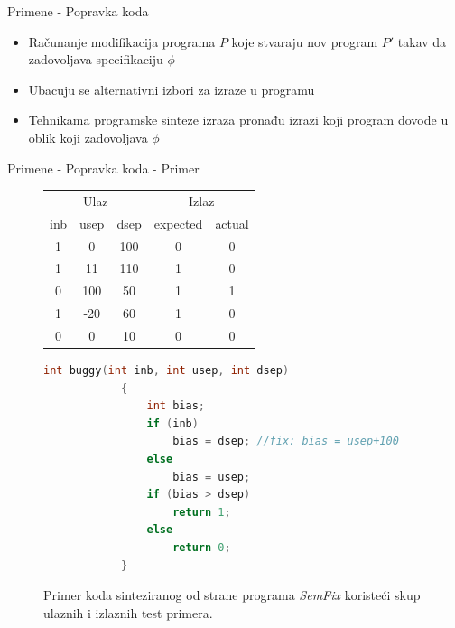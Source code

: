 \documentclass{beamer}
\begin{document}
\begin{frame}{Primene - Popravka koda}
    \begin{itemize}
        \item Računanje modifikacija programa $P$ koje stvaraju nov program $P'$ takav da zadovoljava specifikaciju $\phi$
        \item Ubacuju se alternativni izbori za izraze u programu
        \item Tehnikama programske sinteze izraza pronađu izrazi koji program dovode u oblik koji zadovoljava $\phi$
    \end{itemize}
\end{frame}

\begin{frame}[fragile]{Primene - Popravka koda - Primer}
    \begin{figure}[!h]
        \centering
        \tiny
        \begin{tabular}{ccc|cc}
            \multicolumn{3}{c|}{Ulaz} & \multicolumn{2}{c}{Izlaz}\\
            inb & usep & dsep & expected & actual \\
            \hline
            1 & 0 & 100 & 0 & 0 \\
            1 & 11 & 110 & 1 & 0 \\
            0 & 100 & 50 & 1 & 1 \\
            1 & -20 & 60 & 1 & 0 \\
            0 & 0 & 10 & 0 & 0 \\
        \end{tabular}

        \centering
        \begin{lstlisting}[language=C, basicstyle=\tiny]
            int buggy(int inb, int usep, int dsep)
            {
                int bias;
                if (inb)
                    bias = dsep; //fix: bias = usep+100
                else
                    bias = usep;
                if (bias > dsep)
                    return 1;
                else
                    return 0;
            }
        \end{lstlisting}

        \caption{Primer koda sinteziranog od strane programa \emph{SemFix} koristeći skup ulaznih i izlaznih test primera.}
        \label{fig:CodeRepair}
    \end{figure}
\end{frame}
\end{document}
